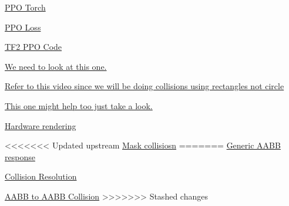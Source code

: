 \vs
\href{https://github.com/philtabor/Youtube-Code-Repository/blob/master/ReinforcementLearning/PolicyGradient/PPO/torch/ppo_torch.py}{PPO Torch}

\vs
\href{https://pytorch.org/rl/reference/generated/torchrl.objectives.PPOLoss.html}{PPO Loss}

\vs
\href{https://github.com/abhisheksuran/Reinforcement_Learning/blob/master/PPO.ipynb}{TF2 PPO Code}

\vs
\href{https://www.youtube.com/watch?v=W9uKzPFS1CI&t=2341s}{We need to look at this one.}

\vs
\href{https://www.youtube.com/watch?v=VpSWuywFlC8}{Refer to this video since we will be doing collisions using rectangles not circle}

\vs
\href{https://gamedev.stackexchange.com/questions/199861/collision-detection-between-moving-objects-in-pygame}{This one might help too just take a look.}


\vs
\href{https://www.codewithc.com/hardware-accelerated-rendering-in-pygame/}{Hardware rendering}

\vs
<<<<<<< Updated upstream
\href{http://www.codingwithruss.com/pygame/how-to-use-pygame-masks-for-pixel-perfect-collision/}{Mask collisiosn}
=======
\href{https://www.reddit.com/r/gamedev/comments/6bonca/generic_aabb_collision_response/}{Generic AABB response}

\vs
\href{https://gamedev.stackexchange.com/questions/160248/2d-rectangle-collision-resolution}{Collision Resolution}

\vs
\href{https://gamedev.stackexchange.com/questions/164774/aabb-to-aabb-collision-response}{AABB to AABB Collision}
>>>>>>> Stashed changes

